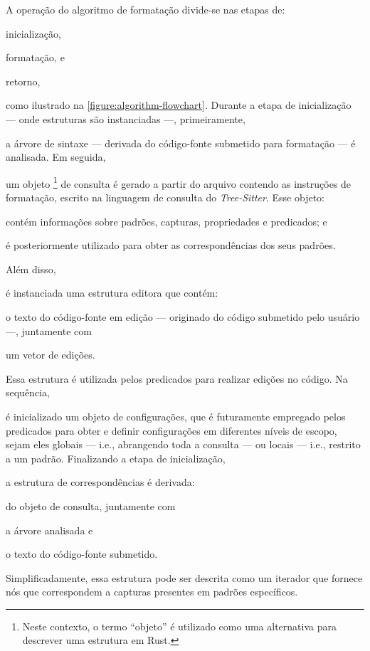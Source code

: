 \documentclass
  [11pt,a4paper,english,brazil,openright,sumario=tradicional,twoside]
  {abntex2}
\newcommand{\treesitter}{\textit{Tree-Sitter}\xspace}
\begin{document}
{{  A operação do algoritmo de formatação divide-se nas etapas de:
  \begin{inparaenum}
    \item inicialização,
    \item formatação, e
    \item retorno,
  \end{inparaenum}
  como ilustrado na \cref{figure:algorithm-flowchart}.
  Durante a etapa de inicialização --- onde estruturas são instanciadas ---,
  primeiramente,
  \begin{inparaenum}
    \item a árvore de sintaxe --- derivada do código-fonte submetido para
          formatação --- é analisada. Em seguida,
    \item um objeto%
          \footnote
            { Neste contexto, o termo ``objeto'' é utilizado como uma
              alternativa para descrever uma estrutura em Rust.}
          de consulta é gerado a partir do arquivo contendo as
          instruções de formatação, escrito na linguagem de consulta do
          \treesitter. Esse objeto:
          \begin{inparaenum}
            \item contém informações sobre padrões, capturas, propriedades e
                  predicados; e
            \item é posteriormente utilizado para obter as correspondências
                  dos seus padrões.
          \end{inparaenum}

          Além disso,
    \item é instanciada uma estrutura editora que contém:
          \begin{inparaenum}
            \item o texto do código-fonte em edição --- originado do código
                  submetido pelo usuário ---, juntamente com
            \item um vetor de edições.
          \end{inparaenum}
          Essa estrutura é utilizada pelos predicados para realizar edições no
          código. Na sequência,
    \item é inicializado um objeto de configurações, que é futuramente
          empregado pelos predicados para obter e definir configurações em
          diferentes níveis de escopo, sejam eles globais --- i.e., abrangendo
          toda a consulta --- ou locais --- i.e., restrito a um padrão.
          Finalizando a etapa de inicialização,
    \item a estrutura de correspondências é derivada:
          \begin{inparaenum}
            \item do objeto de consulta, juntamente com
            \item a árvore analisada e
            \item o texto do código-fonte submetido.
          \end{inparaenum}
          Simplificadamente, essa estrutura pode ser descrita como um iterador
          que fornece nós que correspondem a capturas presentes em padrões
          específicos.
  \end{inparaenum}

}}
\end{document}
